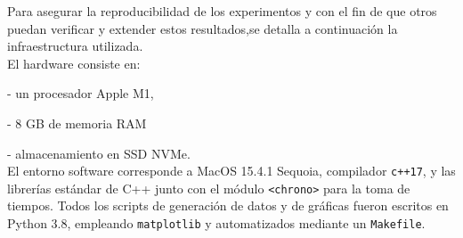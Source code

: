 Para asegurar la reproducibilidad de los experimentos y con el fin de que otros puedan verificar y extender estos resultados,se detalla a continuación la infraestructura utilizada.\\

El hardware consiste en:

- un procesador Apple M1,

- 8 GB de memoria RAM 

- almacenamiento en SSD NVMe.
\\

El entorno software corresponde a MacOS 15.4.1 Sequoia, compilador \texttt{c++17}, y las librerías estándar de C++ junto con el módulo \texttt{<chrono>} para la toma de tiempos. Todos los scripts de generación de datos y de gráficas fueron escritos en Python 3.8, empleando \texttt{matplotlib} y automatizados mediante un \texttt{Makefile}.
